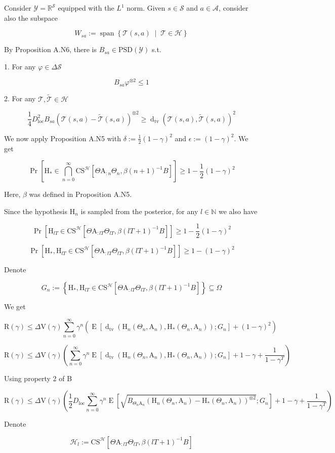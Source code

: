 \documentclass[a4paper]{article}
\DeclareMathOperator{\Sp}{span}
\newcommand{\AP}[1]{\left(#1\right)}
\newcommand{\AB}[1]{\left[#1\right]}
\newcommand{\AC}[1]{\left\{#1\right\}}
\newcommand{\ACM}[2]{\left\{#1\;\middle\vert\;#2\right\}}
\newcommand{\Pa}[2]{\underset{#1}{\operatorname{Pr}}\AB{#2}}
\newcommand{\Ea}[2]{\underset{#1}{\operatorname{E}}\AB{#2}}
\newcommand{\Dtva}[1]{\operatorname{d}_{\text{tv}}\AP{#1}}
\newcommand{\Nats}{\mathbb{N}}
\newcommand{\Reals}{\mathbb{R}}
\newcommand{\PSD}{\mathrm{PSD}}
\newcommand{\B}{B}
\newcommand{\Y}{\mathcal{Y}}
\newcommand{\St}{\mathcal{S}}
\newcommand{\A}{\mathcal{A}}
\newcommand{\T}{\mathcal{T}}
\newcommand{\Hy}{\mathcal{H}}
\newcommand{\DL}{D_{\mathrm{loc}}}
\newcommand{\V}{\mathrm{V}}
\newcommand{\Reg}{\mathrm{R}}
\newcommand{\CS}{\mathrm{CS}}
\newcommand{\AT}{\mathrm{A}}
\newcommand{\THy}{\mathrm{H}_*}
\newcommand{\SHy}{\mathrm{H}}
\newcommand{\CSE}{G}
\begin{document}
Consider $\Y=\Reals^\St$ equipped with the $L^1$ norm. Given $s\in\St$ and $a\in\A$, consider also the subspace

$$W_{sa}:=\Sp\ACM{\T(s,a)}{\T\in\Hy}$$

By Proposition A.N6, there is $\B_{sa}\in\PSD\AP{\Y}$ s.t.

1. For any $\varphi\in\Delta\St$

$$\B_{sa}\varphi^{\otimes2}\leq1$$

2. For any $\T,\tilde{\T}\in\Hy$

$$\frac{1}{4}\DL^2 B_{sa}\AP{\T(s,a)-\tilde{\T}(s,a)}^{\otimes2} \geq \Dtva{\T(s,a),\tilde{\T}(s,a)}^2$$

We now apply Proposition A.N5 with $\delta:=\frac{1}{2}(1-\gamma)^2$ and $\epsilon:=(1-\gamma)^2$. We get

$$\Pa{}{\SHy_*\in\bigcap_{n=0}^\infty\CS^\Hy\AB{\Theta\AT_{:n}\Theta_n,\beta(n+1)^{-1}\B}} \geq 1-\frac{1}{2}(1-\gamma)^2$$

Here, $\beta$ was defined in Proposition A.N5.

Since the hypothesis $\SHy_n$ is sampled from the posterior, for any $l\in\Nats$ we also have

$$\Pa{}{\SHy_{lT}\in\CS^\Hy\AB{\Theta\AT_{:lT}\Theta_{lT},\beta(lT+1)^{-1}\B}} \geq 1-\frac{1}{2}(1-\gamma)^2$$

$$\Pa{}{\SHy_*,\SHy_{lT}\in\CS^\Hy\AB{\Theta\AT_{:lT}\Theta_{lT},\beta(lT+1)^{-1}\B}} \geq 1-(1-\gamma)^2$$

Denote

$$\CSE_n:=\AC{\SHy_*,\SHy_{lT}\in\CS^\Hy\AB{\Theta\AT_{:lT}\Theta_{lT},\beta(lT+1)^{-1}\B}}\subseteq\Omega$$

We get

$$\Reg(\gamma)\leq\Delta\V(\gamma)\sum_{n=0}^\infty\gamma^{n}\AP{\Ea{}{\Dtva{\SHy_n\AP{\Theta_n,\AT_n},\THy\AP{\Theta_n,\AT_n}};\CSE_n }+(1-\gamma)^2}$$

$$\Reg(\gamma)\leq\Delta\V(\gamma)\AP{\sum_{n=0}^\infty\gamma^{n}\Ea{}{\Dtva{\SHy_n\AP{\Theta_n,\AT_n},\THy\AP{\Theta_n,\AT_n}};\CSE_n }+1-\gamma+\frac{1}{1-\gamma^T}}$$

Using property 2 of B

$$\Reg(\gamma)\leq\Delta\V(\gamma)\AP{\frac{1}{2}\DL\sum_{n=0}^\infty\gamma^{n}\Ea{}{\sqrt{B_{\Theta_n\AT_n}\AP{\SHy_n\AP{\Theta_n,\AT_n}-\THy\AP{\Theta_n,\AT_n}}^{\otimes2}};\CSE_n }+1-\gamma+\frac{1}{1-\gamma^T}}$$

Denote

$$\Hy_l:=\CS^\Hy\AB{\Theta\AT_{:lT}\Theta_{lT},\beta(lT+1)^{-1}\B}$$
\end{document}
